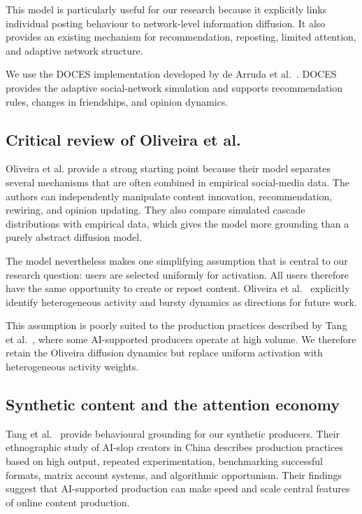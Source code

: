 \documentclass[runningheads]{llncs}
\begin{document}
This model is particularly useful for our research because it explicitly links individual posting behaviour to network-level information diffusion. It also provides an existing mechanism for recommendation, reposting, limited attention, and adaptive network structure.

We use the DOCES implementation developed by de Arruda et al.~\cite{deArruda2025}. DOCES provides the adaptive social-network simulation and supports recommendation rules, changes in friendships, and opinion dynamics.

\subsection{Critical review of Oliveira et al.}
Oliveira et al. provide a strong starting point because their model separates several mechanisms that are often combined in empirical social-media data. The authors can independently manipulate content innovation, recommendation, rewiring, and opinion updating. They also compare simulated cascade distributions with empirical data, which gives the model more grounding than a purely abstract diffusion model.

The model nevertheless makes one simplifying assumption that is central to our research question: users are selected uniformly for activation. All users therefore have the same opportunity to create or repost content. Oliveira et al.~\cite{oliveira2026} explicitly identify heterogeneous activity and bursty dynamics as directions for future work.

This assumption is poorly suited to the production practices described by Tang et al.~\cite{tang2026}, where some AI-supported producers operate at high volume. We therefore retain the Oliveira diffusion dynamics but replace uniform activation with heterogeneous activity weights.

\subsection{Synthetic content and the attention economy}

Tang et al.~\cite{tang2026} provide behavioural grounding for our synthetic producers. Their ethnographic study of AI-slop creators in China describes production practices based on high output, repeated experimentation, benchmarking successful formats, matrix account systems, and algorithmic opportunism. Their findings suggest that AI-supported production can make speed and scale central features of online content production.
\end{document}

